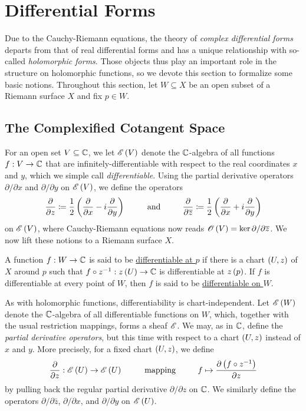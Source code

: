 \documentclass[../Moduli_Spaces_of_Riemann_Surfaces.tex]{subfiles}
\begin{document}
    \section{Differential Forms}\label{CC:sec:differential_forms}
    Due to the Cauchy-Riemann equations, the theory of \textit{complex differential forms} departs from that of real differential forms and has a unique relationship with so-called \textit{holomorphic forms}. Those objects thus play an important role in the structure on holomorphic functions, so we devote this section to formalize some basic notions. Throughout this section, let $W\subseteq X$ be an open subset of a Riemann surface $X$ and fix $p\in W$.
    \subsection{The Complexified Cotangent Space}
    For an open set $V\subseteq\mathbb{C}$, we let $\mathscr{E}\left(V\right)$ denote the $\mathbb{C}$-algebra of all functions $f:V\to\mathbb{C}$ that are infinitely-differentiable with respect to the real coordinates $x$ and $y$, which we simple call \textit{differentiable}. Using the partial derivative operators $\partial/\partial x$ and $\partial/\partial y$ on $\mathscr{E}\left(V\right)$, we define the operators
    \begin{equation*}
        \frac{\partial}{\partial z}\coloneqq\frac{1}{2}\l(\frac{\partial}{\partial x}-i\frac{\partial}{\partial y}\r)\ \ \ \ \ \ \ \ \textrm{and}\ \ \ \ \ \ \ \ \frac{\partial}{\partial\bar{z}}\coloneqq\frac{1}{2}\l(\frac{\partial}{\partial x}+i\frac{\partial}{\partial y}\r)
    \end{equation*}
    on $\mathscr{E}\left(V\right)$, where Cauchy-Riemann equations now reads $\mathscr{O}\left(V\right)=\ker\partial/\partial\overline{z}$. We now lift these notions to a Riemann surface $X$.
    \begin{definition}
        A function $f:W\to\mathbb{C}$ is said to be \ul{differentiable at $p$} if there is a chart $\left(U,z\right)$ of $X$ around $p$ such that $f\circ z^{-1}:z\left(U\right)\to\mathbb{C}$ is differentiable at $z\left(p\right)$. If $f$ is differentiable at every point of $W$, then $f$ is said to be \ul{differentiable on $W$}.
    \end{definition}
    \begin{remark}
        As with holomorphic functions, differentiability is chart-independent. Let $\mathscr{E}\left(W\right)$ denote the $\mathbb{C}$-algebra of all differentiable functions on $W$, which, together with the usual restriction mappings, forms a sheaf $\mathscr{E}$. We may, as in $\mathbb{C}$, define the \textit{partial derivative operators}, but this time with respect to a chart $\left(U,z\right)$ instead of $x$ and $y$. More precisely, for a fixed chart $\left(U,z\right)$, we define
        \begin{equation*}
            \frac{\partial}{\partial z}:\DIFF\l(U\r)\to\DIFF\l(U\r)\ \ \ \ \ \ \ \ \textrm{mapping}\ \ \ \ \ \ \ \ f\mapsto\frac{\partial\l(f\circ z^{-1}\r)}{\partial z}
        \end{equation*}
        by pulling back the regular partial derivative $\partial/\partial z$ on $\mathbb{C}$. We similarly define the operators $\partial/\partial\bar{z}$, $\partial/\partial x$, and $\partial/\partial y$ on $\mathscr{E}\left(U\right)$.\exqed
    \end{remark}
\end{document}
